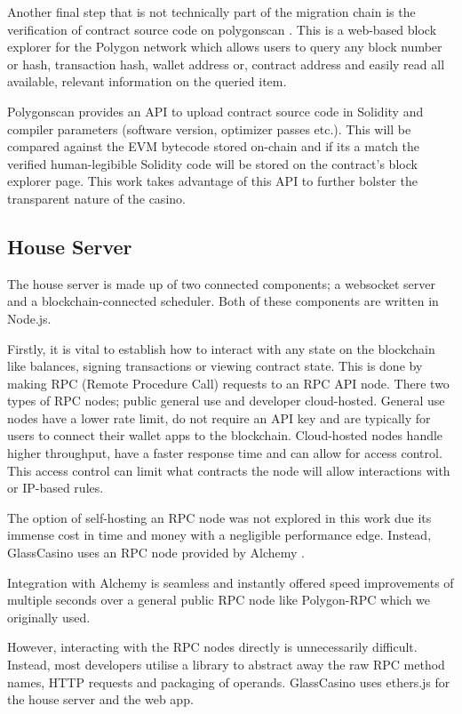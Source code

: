 \documentclass[10pt,journal,compsoc]{IEEEtran}
\begin{document}
Another final step that is not technically part of the migration chain is the verification of contract source code on polygonscan \cite{polygonscan}. This is a web-based block explorer for the Polygon network which allows users to query any block number or hash, transaction hash, wallet address or, contract address and easily read all available, relevant information on the queried item. 

Polygonscan provides an API to upload contract source code in Solidity and compiler parameters (software version, optimizer passes etc.). This will be compared against the EVM bytecode stored on-chain and if its a match the verified human-legibible Solidity code will be stored on the contract's block explorer page. This work takes advantage of this API to further bolster the transparent nature of the casino.

\subsection{House Server}
\label{sec:house}
The house server is made up of two connected components; a websocket server and a blockchain-connected scheduler. Both of these components are written in Node.js.

Firstly, it is vital to establish how to interact with any state on the blockchain like balances, signing transactions or viewing contract state. This is done by making RPC (Remote Procedure Call) requests to an RPC API node. There two types of RPC nodes; public general use and developer cloud-hosted. General use nodes have a lower rate limit, do not require an API key and are typically for users to connect their wallet apps to the blockchain. Cloud-hosted nodes handle higher throughput, have a faster response time and can allow for access control. This access control can limit what contracts the node will allow interactions with or IP-based rules.

The option of self-hosting an RPC node was not explored in this work due its immense cost in time and money with a negligible performance edge. Instead, GlassCasino uses an RPC node provided by Alchemy \cite{why_use_alchemy_alchemy_documentation}. 

Integration with Alchemy is seamless and instantly offered speed improvements of multiple seconds over a general public RPC node like Polygon-RPC \cite{your_instant_rpc_gateway_to_polygon} which we originally used.

However, interacting with the RPC nodes directly is unnecessarily difficult. Instead, most developers utilise a library to abstract away the raw RPC method names, HTTP requests and packaging of operands. GlassCasino uses ethers.js \cite{ethers.js} for the house server and the web app.
\end{document}
